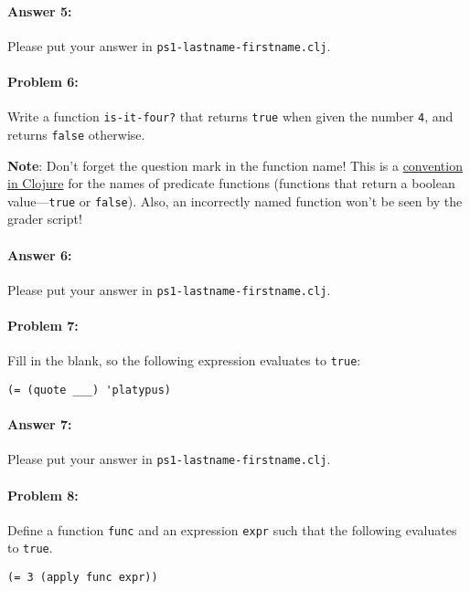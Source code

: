 \documentclass[10pt]{article}
\newcommand{\PSnum}{1}
\begin{document}
\paragraph{Answer 5:} Please put your answer in \texttt{ps\PSnum-lastname-firstname.clj}.

\noindent\hrulefill%

\paragraph{Problem 6:}
Write a function \texttt{is-it-four?} that returns \texttt{true} when given the number \texttt{4}, and returns \texttt{false} otherwise.

\textbf{Note}: Don't forget the question mark in the function name!  This is a
\href{https://guide.clojure.style/\#naming-predicates}{convention in Clojure}
for the names of predicate functions (functions that return a
boolean value---\texttt{true} or \texttt{false}).  Also, an
incorrectly named function won't be seen by the grader script!

\paragraph{Answer 6:} Please put your answer in \texttt{ps\PSnum-lastname-firstname.clj}.

\noindent\hrulefill%

\paragraph{Problem 7:}
Fill in the blank, so the following expression evaluates to \texttt{true}:
\begin{lstlisting}
(= (quote ___) 'platypus)
\end{lstlisting}

\paragraph{Answer 7:} Please put your answer in \texttt{ps\PSnum-lastname-firstname.clj}.

\noindent\hrulefill%

\paragraph{Problem 8:}
Define a function \texttt{func} and an expression \texttt{expr} such that the following evaluates to \texttt{true}.
\begin{lstlisting}
(= 3 (apply func expr))
\end{lstlisting}
\end{document}

